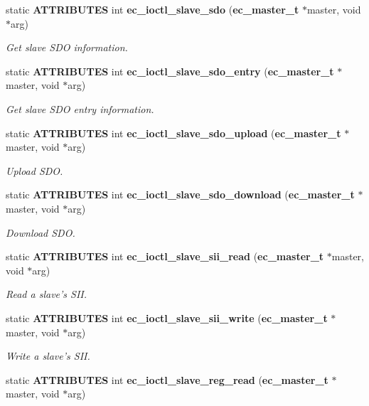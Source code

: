 \begin{DoxyCompactItemize}
static {\bf \-A\-T\-T\-R\-I\-B\-U\-T\-E\-S} int {\bf ec\-\_\-ioctl\-\_\-slave\-\_\-sdo} ({\bf ec\-\_\-master\-\_\-t} $\ast$master, void $\ast$arg)
\begin{DoxyCompactList}\small\item\em \-Get slave \-S\-D\-O information. \end{DoxyCompactList}\item 
static {\bf \-A\-T\-T\-R\-I\-B\-U\-T\-E\-S} int {\bf ec\-\_\-ioctl\-\_\-slave\-\_\-sdo\-\_\-entry} ({\bf ec\-\_\-master\-\_\-t} $\ast$master, void $\ast$arg)
\begin{DoxyCompactList}\small\item\em \-Get slave \-S\-D\-O entry information. \end{DoxyCompactList}\item 
static {\bf \-A\-T\-T\-R\-I\-B\-U\-T\-E\-S} int {\bf ec\-\_\-ioctl\-\_\-slave\-\_\-sdo\-\_\-upload} ({\bf ec\-\_\-master\-\_\-t} $\ast$master, void $\ast$arg)
\begin{DoxyCompactList}\small\item\em \-Upload \-S\-D\-O. \end{DoxyCompactList}\item 
static {\bf \-A\-T\-T\-R\-I\-B\-U\-T\-E\-S} int {\bf ec\-\_\-ioctl\-\_\-slave\-\_\-sdo\-\_\-download} ({\bf ec\-\_\-master\-\_\-t} $\ast$master, void $\ast$arg)
\begin{DoxyCompactList}\small\item\em \-Download \-S\-D\-O. \end{DoxyCompactList}\item 
static {\bf \-A\-T\-T\-R\-I\-B\-U\-T\-E\-S} int {\bf ec\-\_\-ioctl\-\_\-slave\-\_\-sii\-\_\-read} ({\bf ec\-\_\-master\-\_\-t} $\ast$master, void $\ast$arg)
\begin{DoxyCompactList}\small\item\em \-Read a slave's \-S\-I\-I. \end{DoxyCompactList}\item 
static {\bf \-A\-T\-T\-R\-I\-B\-U\-T\-E\-S} int {\bf ec\-\_\-ioctl\-\_\-slave\-\_\-sii\-\_\-write} ({\bf ec\-\_\-master\-\_\-t} $\ast$master, void $\ast$arg)
\begin{DoxyCompactList}\small\item\em \-Write a slave's \-S\-I\-I. \end{DoxyCompactList}\item 
static {\bf \-A\-T\-T\-R\-I\-B\-U\-T\-E\-S} int {\bf ec\-\_\-ioctl\-\_\-slave\-\_\-reg\-\_\-read} ({\bf ec\-\_\-master\-\_\-t} $\ast$master, void $\ast$arg)

\end{DoxyCompactItemize}
